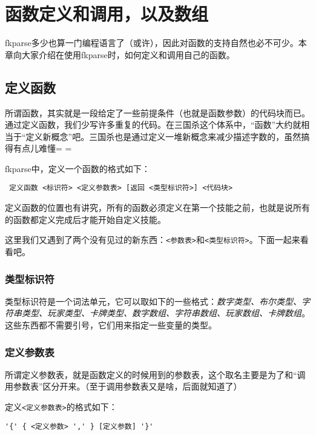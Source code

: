 \chapter{函数定义和调用，以及数组}

fkparse多少也算一门编程语言了（或许），因此对函数的支持自然也必不可少。本章向大家介绍在使用fkparse时，如何定义和调用自己的函数。

\section{定义函数}

所谓函数，其实就是一段给定了一些前提条件（也就是函数参数）的代码块而已。通过定义函数，我们少写许多重复的代码。在三国杀这个体系中，“函数”大约就相当于“定义新概念”吧。三国杀也是通过定义一堆新概念来减少描述字数的，虽然搞得有点儿难懂= =

fkparse中，定义一个函数的格式如下：

\begin{verbatim}
 定义函数 <标识符> <定义参数表> [返回 <类型标识符>] <代码块>
\end{verbatim}

定义函数的位置也有讲究，所有的函数必须定义在第一个技能之前，也就是说所有的函数都定义完成后才能开始自定义技能。

这里我们又遇到了两个没有见过的新东西：\verb|<参数表>|和\verb|<类型标识符>|。下面一起来看看吧。

\subsection{类型标识符}

类型标识符是一个词法单元，它可以取如下的一些格式：\emph{数字类型、布尔类型、字符串类型、玩家类型、卡牌类型、数字数组、字符串数组、玩家数组、卡牌数组}。这些东西都不需要引号，它们用来指定一些变量的类型。

\subsection{定义参数表}

所谓定义参数表，就是函数定义的时候用到的参数表，这个取名主要是为了和“调用参数表”区分开来。（至于调用参数表又是啥，后面就知道了）

定义\verb|<定义参数表>|的格式如下：

\begin{verbatim}
'{' { <定义参数> ',' } [定义参数] '}'
\end{verbatim}


